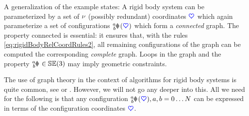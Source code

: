 A generalization of the example states:
A rigid body system can be parameterized by a set of $\nu$ (possibly redundant) coordinates $\boldsymbol{\textcolor{blue}{\heartsuit}}$ which again parameterize a set of configurations $\bodyHomoCoord{\BidxI}{\BidxII}(\sysCoord)$ which form a \textit{connected} graph.
The property connected is essential: it ensures that, with the rules \eqref{eq:rigidBodyRelCoordRules2}, all remaining configurations of the graph can be computed \ie the corresponding \textit{complete} graph.
Loops in the graph and the property $\bodyHomoCoord{\BidxI}{\BidxII} \in \SpecialEuclideanGroup(3)$ may imply geometric constraints.

The use of graph theory in the context of algorithms for rigid body systems is quite common, see \eg \cite[sec.\,8.2]{Schwertassek:MultibodySystems} or \cite[sec.\,5.3]{Wittenburg:DynamicsOfMultibodySystems}.
However, we will not go any deeper into this.
All we need for the following is that any configuration $\bodyHomoCoord{\BidxI}{\BidxII}(\sysCoord), \BidxI,\BidxII = 0\ldots\numRigidBodies$ can be expressed in terms of the configuration coordinates $\boldsymbol{\textcolor{blue}{\heartsuit}}$.

